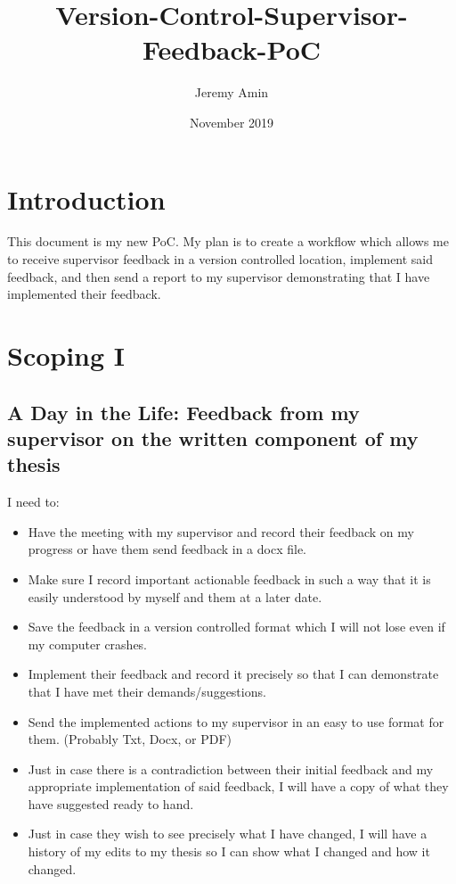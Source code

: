 \documentclass{article}
\title{Version-Control-Supervisor-Feedback-PoC}
\author{Jeremy Amin}
\date{November 2019}
\begin{document}
\maketitle
\tableofcontents

\pagebreak

\section{Introduction}

This document is my new PoC. My plan is to create a workflow which allows me to receive supervisor feedback in a version controlled location, implement said feedback, and then send a report to my supervisor demonstrating that I have implemented their feedback.

\section{Scoping I}

\subsection{A Day in the Life: Feedback from my supervisor on the written component of my thesis}

I need to:
\begin{itemize}
    \item Have the meeting with my supervisor and record their feedback on my progress or have them send feedback in a docx file.
    \item Make sure I record important actionable feedback in such a way that it is easily understood by myself and them at a later date.
    \item Save the feedback in a version controlled format which I will not lose even if my computer crashes.
    \item Implement their feedback and record it precisely so that I can demonstrate that I have met their demands/suggestions.
    \item Send the implemented actions to my supervisor in an easy to use format for them. (Probably Txt, Docx, or PDF)
    \item Just in case there is a contradiction between their initial feedback and my appropriate implementation of said feedback, I will have a copy of what they have suggested ready to hand.
    \item Just in case they wish to see precisely what I have changed, I will have a history of my edits to my thesis so I can show what I changed and how it changed.
\end{itemize}
\end{document}
